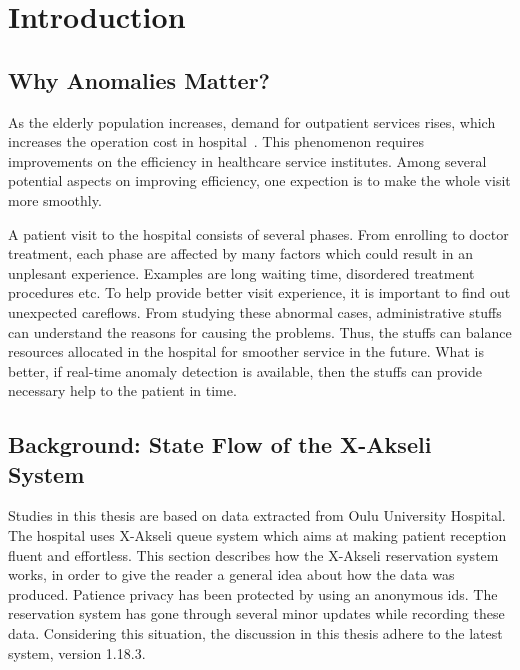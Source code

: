 \chapter{Introduction}
\label{chapter:intro}
\section{Why Anomalies Matter?}
As the elderly population increases, demand for outpatient services rises, which increases the operation cost in hospital~\cite{gupta2008appointment}\cite{hulshof2012taxonomic}. This phenomenon requires improvements on the efficiency in healthcare service institutes. Among several potential aspects on improving efficiency, one expection is to make the whole visit more smoothly. 

A patient visit to the hospital consists of several phases. From enrolling to doctor treatment, each phase are affected by many factors which could result in an unplesant experience. Examples are long waiting time, disordered treatment procedures etc. To help provide better visit experience, it is important to find out unexpected careflows. From studying these abnormal cases, administrative stuffs can understand the reasons for causing the problems. Thus, the stuffs can balance resources allocated in the hospital for smoother service in the future. What is better, if real-time anomaly detection is available, then the stuffs can provide necessary help to the patient in time.

\section{Background: State Flow of the X-Akseli System}
Studies in this thesis are based on data extracted from Oulu University Hospital. The hospital uses X-Akseli queue system which aims at making patient reception fluent and effortless. This section describes how the X-Akseli reservation system works, in order to give the reader a general idea about how the data was produced. Patience privacy has been protected by using an anonymous ids. The reservation system has gone through several minor updates while recording these data. Considering this situation, the discussion in this thesis adhere to the latest system, version 1.18.3.

